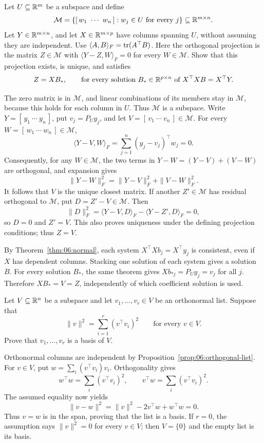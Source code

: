 \begin{problem}\label{ex:06:matrix-projection}
Let \(U\subseteq\mathbb R^m\) be a subspace and define
\[
\mathcal M=\{[\,w_1\ \cdots\ w_n\,]:w_j\in U\text{ for every }j\}
\subseteq\mathbb R^{m\times n}.
\]
Let \(Y\in\mathbb R^{m\times n}\), and let \(X\in\mathbb R^{m\times p}\)
have columns spanning \(U\), without assuming they are independent.
Use \(\langle A,B\rangle_F=\operatorname{tr}(A^\top B)\).
Here the orthogonal projection is the matrix \(Z\in\mathcal M\) with
\(\langle Y-Z,W\rangle_F=0\) for every \(W\in\mathcal M\).
Show that this projection exists, is unique, and satisfies
\[
Z=XB_*,\qquad\text{for every solution }B_*\in\mathbb R^{p\times n}
\text{ of }X^\top XB=X^\top Y.
\]
\end{problem}
\begin{solution}
The zero matrix is in \(\mathcal M\), and linear combinations of its
members stay in \(\mathcal M\), because this holds for each column in \(U\).
Thus \(\mathcal M\) is a subspace.
Write \(Y=[\,y_1\ \cdots\ y_n\,]\), put \(v_j=P_Uy_j\), and
let \(V=[\,v_1\ \cdots\ v_n\,]\in\mathcal M\).
For every \(W=[\,w_1\ \cdots\ w_n\,]\in\mathcal M\),
\[
\langle Y-V,W\rangle_F
=\sum_{j=1}^n(y_j-v_j)^\top w_j=0.
\]
Consequently, for any \(W\in\mathcal M\), the two terms in
\(Y-W=(Y-V)+(V-W)\) are orthogonal, and expansion gives
\[
\|Y-W\|_F^2=\|Y-V\|_F^2+\|V-W\|_F^2.
\]
It follows that \(V\) is the unique closest matrix.
If another \(Z'\in\mathcal M\) has residual orthogonal to \(\mathcal M\),
put \(D=Z'-V\in\mathcal M\). Then
\[
\|D\|_F^2
=\langle Y-V,D\rangle_F-\langle Y-Z',D\rangle_F=0,
\]
so \(D=0\) and \(Z'=V\).
This also proves uniqueness under the defining projection conditions;
thus \(Z=V\).

By Theorem~\ref{thm:06:normal}, each system
\(X^\top Xb_j=X^\top y_j\) is consistent, even if \(X\) has dependent
columns. Stacking one solution of each system gives a solution \(B\).
For every solution \(B_*\), the same theorem gives
\(Xb_{*j}=P_Uy_j=v_j\) for all \(j\).
Therefore \(XB_*=V=Z\), independently of which coefficient solution is used.
\end{solution}

\begin{problem}\label{ex:06:parseval-converse}
Let \(V\subseteq\mathbb R^n\) be a subspace and let \(v_1,\ldots,v_r\in V\)
be an orthonormal list. Suppose that
\[
\|v\|^2=\sum_{i=1}^r(v^\top v_i)^2
\qquad\text{for every }v\in V.
\]
Prove that \(v_1,\ldots,v_r\) is a basis of \(V\).
\end{problem}
\begin{solution}
Orthonormal columns are independent by Proposition~\ref{prop:06:orthogonal-list}.
For \(v\in V\), put \(w=\sum_i(v^\top v_i)v_i\).
Orthogonality gives
\[
w^\top w=\sum_i(v^\top v_i)^2,\qquad
v^\top w=\sum_i(v^\top v_i)^2.
\]
The assumed equality now yields
\[
\|v-w\|^2=\|v\|^2-2v^\top w+w^\top w=0.
\]
Thus \(v=w\) is in the span, proving that the list is a basis.
If \(r=0\), the assumption says \(\|v\|^2=0\) for every \(v\in V\);
then \(V=\{0\}\) and the empty list is its basis.
\end{solution}
